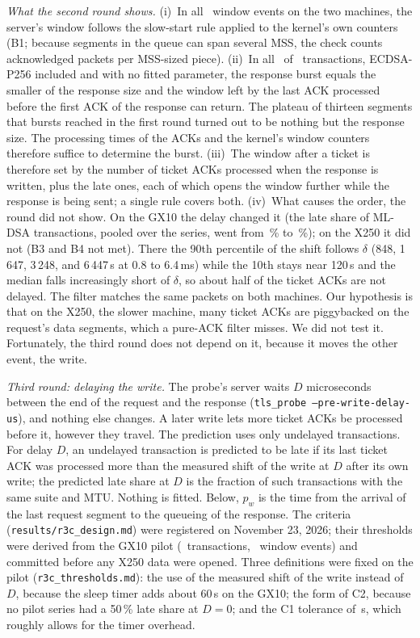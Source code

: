 \documentclass[9pt]{article}
\begin{document}
\emph{What the second round shows.} (i)~In all \RbEvN\ window events on the two machines, the server's window follows the slow-start rule applied to the kernel's own counters (B1; because segments in the queue can span several MSS, the check counts acknowledged packets per MSS-sized piece). (ii)~In all \RbTxN\ of \RbTxN\ transactions, ECDSA-P256 included and with no fitted parameter, the response burst equals the smaller of the response size and the window left by the last ACK processed before the first ACK of the response can return. The plateau of thirteen segments that bursts reached in the first round turned out to be nothing but the response size. The processing times of the ACKs and the kernel's window counters therefore suffice to determine the burst. (iii)~The window after a ticket is therefore set by the number of ticket ACKs processed when the response is written, plus the late ones, each of which opens the window further while the response is being sent; a single rule covers both. (iv)~What causes the order, the round did not show. On the GX10 the delay changed it (the late share of ML-DSA transactions, pooled over the series, went from \RbPilotLateZero\,\% to \RbPilotLateMax\,\%); on the X250 it did not (B3 and B4 not met). There the 90th percentile of the shift follows $\delta$ (848, 1\,647, 3\,248, and 6\,447\,\textmu s at 0.8 to 6.4\,ms) while the 10th stays near 120\,\textmu s and the median falls increasingly short of $\delta$, so about half of the ticket ACKs are not delayed. The filter matches the same packets on both machines. Our hypothesis is that on the X250, the slower machine, many ticket ACKs are piggybacked on the request's data segments, which a pure-ACK filter misses. We did not test it. Fortunately, the third round does not depend on it, because it moves the other event, the write.

\emph{Third round: delaying the write.} The probe's server waits $D$ microseconds between the end of the request and the response (\texttt{tls\_probe --pre-write-delay-us}), and nothing else changes. A later write lets more ticket ACKs be processed before it, however they travel. The prediction uses only undelayed transactions. For delay $D$, an undelayed transaction is predicted to be late if its last ticket ACK was processed more than the measured shift of the write at $D$ after its own write; the predicted late share at $D$ is the fraction of such transactions with the same suite and MTU. Nothing is fitted. Below, $p_w$ is the time from the arrival of the last request segment to the queueing of the response. The criteria (\texttt{results/r3c\_design.md}) were registered on November 23, 2026; their thresholds were derived from the GX10 pilot (\RcPilotTxN\ transactions, \RcPilotEvN\ window events) and committed before any X250 data were opened. Three definitions were fixed on the pilot (\texttt{r3c\_thresholds.md}): the use of the measured shift of the write instead of $D$, because the sleep timer adds about 60\,\textmu s on the GX10; the form of C2, because no pilot series had a 50\,\% late share at $D=0$; and the C1 tolerance of \RcTolerance\,\textmu s, which roughly allows for the timer overhead.
\end{document}
